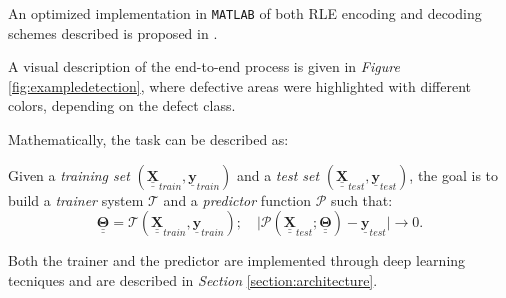         \par{
            An optimized implementation in \texttt{MATLAB} of both RLE encoding and decoding schemes described is proposed in \cite{antonioterpin:github}.
        }
        \par{
            A visual description of the end-to-end process is given in \emph{Figure} \ref{fig:exampledetection}, where defective areas were highlighted with different colors, depending on the defect class.
        }
        \par{
            Mathematically, the task can be described as:
        }
        \par{
            Given a \emph{training set} $\left(\underline{\underline{\mathbf{X}}}_{train}, \underline{\mathbf{y}}_{train}\right)$ and a \emph{test set} $\left(\underline{\underline{\mathbf{X}}}_{test}, \underline{\mathbf{y}}_{test}\right)$, the goal is to build a \emph{trainer} system $\mathcal{T}$ and a \emph{predictor} function $\mathcal{P}$ such that:
            \begin{equation*}
                \underline{\underline{\mathbf{\Theta}}} = \mathcal{T}\left(\underline{\underline{\mathbf{X}}}_{train}, \underline{\mathbf{y}}_{train}\right);\quad \lvert \mathcal{P}\left(\underline{\underline{\mathbf{X}}}_{test}; \underline{\underline{\mathbf{\Theta}}}\right) - \underline{\mathbf{y}}_{test} \rvert \rightarrow 0.
            \end{equation*}
        }
        \par{
            Both the trainer and the predictor are implemented through deep learning tecniques and are described in \emph{Section} \ref{section:architecture}.
        }

